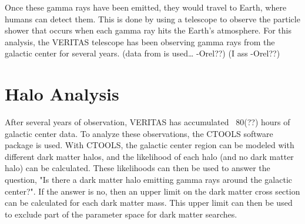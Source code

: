 Once these gamma rays have been emitted, they would travel to Earth, where humans can detect them.
This is done by using a telescope to observe the particle shower that occurs when each gamma ray hits the Earth's atmosphere.
For this analysis, the VERITAS telescope has been observing gamma rays from the galactic center for several years.
(data from is used… -Orel??)
(I ass -Orel??)


\section{Halo Analysis}
After several years of observation, VERITAS has accumulated ~80(??) hours of galactic center data.
To analyze these observations, the CTOOLS software package \cite{gammalibctools} is used.
With CTOOLS, the galactic center region can be modeled with different dark matter halos, and the likelihood of each halo (and no dark matter halo) can be calculated.
These likelihoods can then be used to answer the question, "Is there a dark matter halo emitting gamma rays around the galactic center?".
If the answer is no, then an upper limit on the dark matter cross section can be calculated for each dark matter mass.
This upper limit can then be used to exclude part of the parameter space for dark matter searches.



